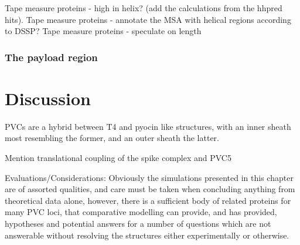 Tape measure proteins - high in helix? (add the calculations from the hhpred hits).
Tape measure proteins - annotate the MSA with helical regions according to DSSP?
Tape measure proteins - speculate on length

\subsubsection{The payload region}











\section{Discussion}
PVCs are a hybrid between T4 and pyocin like structures, with an inner sheath most resembling the former, and an outer sheath the latter.

Mention translational coupling of the spike complex and PVC5



Evaluations/Considerations:
Obviously the simulations presented in this chapter are of assorted qualities, and care must be taken when concluding anything from theoretical data alone, however, there is a sufficient body of related proteins for many PVC loci, that comparative modelling can provide, and has provided, hypotheses and potential answers for a number of questions which are not answerable without resolving the structures either experimentally or otherwise.


